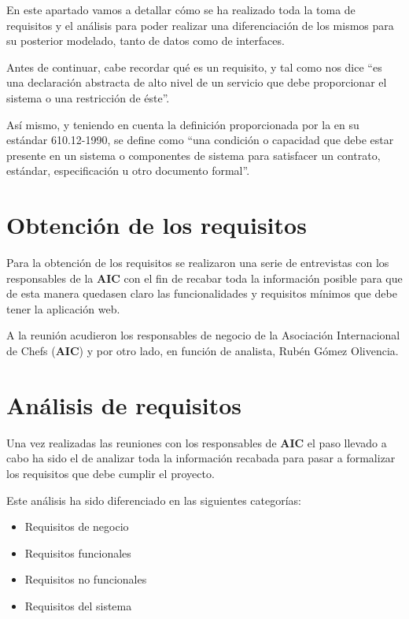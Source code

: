 \documentclass{\ClassPath/viu-tfm-template}
\begin{document}
En este apartado vamos a detallar cómo se ha realizado toda la toma de requisitos y el análisis para poder realizar una diferenciación de los mismos para su posterior modelado, tanto de datos como de interfaces.

Antes de continuar, cabe recordar qué es un requisito, y tal como nos dice \textcite{Sommerville2005} “es una declaración abstracta de alto nivel de un servicio que debe proporcionar el sistema o una restricción de éste”.

Así mismo, y teniendo en cuenta la definición proporcionada por la \textcite{IEEE610} en su estándar 610.12-1990, se define como “una condición o capacidad que debe estar presente en un sistema o componentes de sistema para satisfacer un contrato, estándar, especificación u otro documento formal”.


\section{Obtención de los requisitos}
Para la obtención de los requisitos se realizaron una serie de entrevistas con los responsables de la \textbf{AIC} con el fin de recabar toda la información posible para que de esta manera quedasen claro las funcionalidades y requisitos mínimos que debe tener la aplicación web.

A la reunión acudieron los responsables de negocio de la Asociación Internacional de Chefs (\textbf{AIC}) y por otro lado, en función de analista, Rubén Gómez Olivencia.



\section{Análisis de requisitos}
Una vez realizadas las reuniones con los responsables de \textbf{AIC} el paso llevado a cabo ha sido el de analizar toda la información recabada para pasar a formalizar los requisitos que debe cumplir el proyecto.

Este análisis ha sido diferenciado en las siguientes categorías:

\vspace{-1em}
\begin{itemize}
    \item Requisitos de negocio
    \item Requisitos funcionales
    \item Requisitos no funcionales
    \item Requisitos del sistema
\end{itemize}
\end{document}
